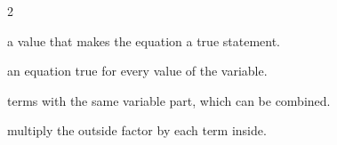 \documentclass[12pt]{article}
\begin{document}
\vspace{0.2cm}

\begin{multicols}{2}
\begin{description}[leftmargin=0.5cm, itemsep=2pt, font=\normalfont\bfseries]
  \item[Solution:] a value that makes the equation a true statement.
  \item[Identity:] an equation true for every value of the variable.
  \item[Like terms:] terms with the same variable part, which can be combined.
  \item[Distribute:] multiply the outside factor by each term inside.
\end{description}
\end{multicols}
\end{document}
